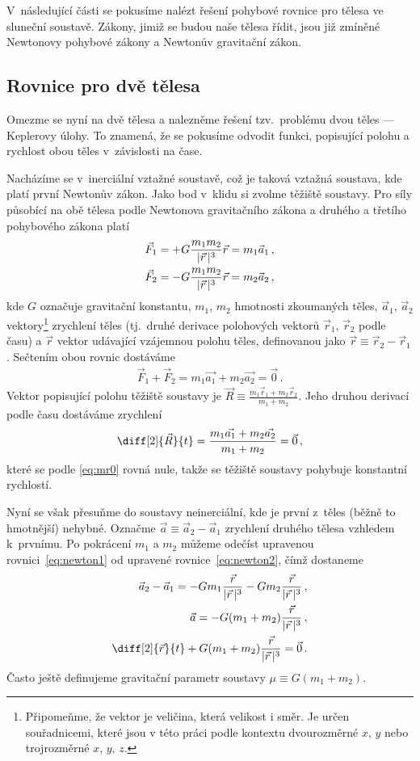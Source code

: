 \documentclass[A4paper, 12pt, oneside]{book}
\begin{document}
V~následující části se pokusíme nalézt řešení pohybové rovnice pro tělesa ve sluneční soustavě. Zákony, jimiž se budou naše tělesa řídit, jsou již zmíněné Newtonovy pohybové zákony a Newtonův gravitační zákon.
\subsection{Rovnice pro dvě tělesa} \label{sec:2body}
Omezme se nyní na dvě tělesa a nalezněme řešení tzv.\ problému dvou těles --- Keplerovy úlohy. To znamená, že se pokusíme odvodit funkci, popisující polohu a rychlost obou těles v~závislosti na čase. 

Nacházíme se v~inerciální vztažné soustavě, což je taková vztažná soustava, kde platí první Newtonův zákon. Jako bod v~klidu si zvolme těžiště soustavy. Pro síly působící na obě tělesa podle Newtonova gravitačního zákona a druhého a třetího pohybového zákona platí
\begin{align} 
	\vec{F}_1 &= +G\frac{m_1m_2}{\lvert \vec{r} \,\rvert^3}\vec{r} = m_1\vec{a}_1\,, \label{eq:newton1} \\
	\vec{F}_2 &= -G\frac{m_1m_2}{\lvert \vec{r} \,\rvert^3}\vec{r} = m_2\vec{a}_2\,, \label{eq:newton2}
\end{align}
kde $G$ označuje gravitační konstantu, $m_1$, $m_2$ hmotnosti zkoumaných těles, $\vec{a}_1$, $\vec{a}_2$ vektory\footnote{Připomeňme, že vektor je veličina, která velikost i směr. Je určen souřadnicemi, které jsou v této práci podle kontextu dvourozměrné $x,\,y$ nebo trojrozměrné $x,\,y,\,z$.}  zrychlení těles (tj.\ druhé derivace polohových vektorů $\vec{r}_1$, $\vec{r}_2$ podle času) a $\vec{r}$ vektor udávající vzájemnou polohu těles, definovanou jako $\vec{r} \equiv \vec{r}_2 - \vec{r}_1$. Sečtením obou rovnic dostáváme
\begin{align} \label{eq:mr0}
	\vec{F}_1 + \vec{F}_2 = m_1\vec{a_1} + m_2\vec{a_2} = \vec{0}\,.
\end{align}
Vektor popisující polohu těžiště soustavy je $\vec{R} \equiv \frac{m_1\vec{r}_1 + m_2\vec{r}_2}{m_1 + m_2}$. Jeho druhou derivací podle času dostáváme zrychlení
\begin{align}
	\diff[2]{\vec{R}}{t} = \frac{m_1\vec{a_1} + m_2\vec{a_2}}{m_1+m_2} = \vec{0}\,,
\end{align}
které se podle \eqref{eq:mr0} rovná nule, takže se těžiště soustavy pohybuje konstantní rychlostí.

Nyní se však přesuňme do soustavy neinerciální, kde je první z~těles (běžně to hmotnější) nehybné. Označme $\vec{a}\equiv\vec{a}_2-\vec{a}_1$ zrychlení druhého tělesa vzhledem k~prvnímu. Po pokrácení $m_1$ a $m_2$ můžeme odečíst upravenou rovnici~\eqref{eq:newton1} od upravené rovnice~\eqref{eq:newton2}, čímž dostaneme
\begin{align}
	\nonumber \vec{a}_2 - \vec{a}_1 = -Gm_1\frac{\vec{r}}{\abs{\vec{r}}^3}-Gm_2\frac{\vec{r}}{\abs{\vec{r}}^3}\,, \\
	\nonumber \vec{a} = -G(m_1+m_2)\frac{\vec{r}}{\abs{\vec{r}}^3}\,, \\
		\diff[2]{\vec{r}}{t} + G(m_1+m_2)\frac{\vec{r}}{\abs{\vec{r}}^3} = \vec{0}\,. \label{eq:eqmotion}
\end{align}
Často ještě definujeme gravitační parametr soustavy $\mu\equiv G(m_1+m_2)$.
\end{document}
